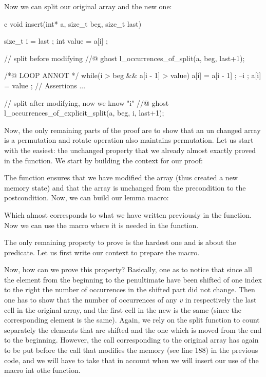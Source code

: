 

Now we can split our original array and the new one:


\begin{CodeBlock}{c}
void insert(int* a, size_t beg, size_t last){
  size_t i = last ;
  int value = a[i] ;

  // split before modifying
  //@ ghost l_occurrences_of_split(a, beg, last+1);

  /*@ LOOP ANNOT */
  while(i > beg && a[i - 1] > value){
    a[i] = a[i - 1] ;
    --i ;
  }
  a[i] = value ;
  // Assertions ...

  // split after modifying, now we know "i"
  //@ ghost l_occurrences_of_explicit_split(a, beg, i, last+1);
}
\end{CodeBlock}


Now, the only remaining parts of the proof are to show that an un changed array
is a permutation and rotate operation also maintains permutation. Let us start
with the easiest: the unchanged property that we already almost exactly proved
in the  function. We start by building the context
for our proof:




The function  ensures that we have
modified the array (thus created a new memory state) and that the array is
unchanged from the precondition to the postcondition. Now, we can build our
lemma macro:




Which almost corresponds to what we have written previously in the
 function. Now we can use the macro where it is needed
in the  function.




The only remaining property to prove is the hardest one and is about the
 predicate. Let us first write our context to prepare
the macro.




Now, how can we prove this property? Basically, one as to notice that since all
the element from the beginning to the penultimate have been shifted of one index
to the right the number of occurrences in the shifted part did not change. Then
one has to show that the number of occurrences of any $v$ in respectively the
last cell in the original array, and the first cell in the new is the same
(since the corresponding element is the same). Again, we rely on the split
function to count separately the elements that are shifted and the one which is
moved from the end to the beginning. However, the call corresponding to the
original array has again to be put before the call that modifies the memory (see
line 188) in the previous code, and we will have to take that in account when we
will insert our use of the macro int othe  function.


